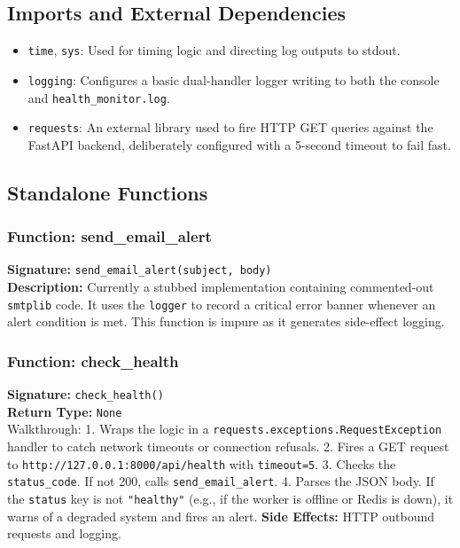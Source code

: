 \documentclass[12pt,a4paper]{report}
\begin{document}
\subsection{Imports and External Dependencies}
\begin{itemize}
\item \texttt{time}, \texttt{sys}: Used for timing logic and directing log outputs to stdout.
\item \texttt{logging}: Configures a basic dual-handler logger writing to both the console and \texttt{health\_monitor.log}.
\item \texttt{requests}: An external library used to fire HTTP GET queries against the FastAPI backend, deliberately configured with a 5-second timeout to fail fast.
\end{itemize}

\subsection{Standalone Functions}
\subsubsection{Function: send\_email\_alert}
\textbf{Signature:} \texttt{send\_email\_alert(subject, body)} \\
\textbf{Description:} Currently a stubbed implementation containing commented-out \texttt{smtplib} code. It uses the \texttt{logger} to record a critical error banner whenever an alert condition is met. This function is impure as it generates side-effect logging.

\subsubsection{Function: check\_health}
\textbf{Signature:} \texttt{check\_health()} \\
\textbf{Return Type:} \texttt{None} \\
Walkthrough:
1. Wraps the logic in a \texttt{requests.exceptions.RequestException} handler to catch network timeouts or connection refusals.
2. Fires a GET request to \texttt{http://127.0.0.1:8000/api/health} with \texttt{timeout=5}.
3. Checks the \texttt{status\_code}. If not 200, calls \texttt{send\_email\_alert}.
4. Parses the JSON body. If the \texttt{status} key is not \texttt{"healthy"} (e.g., if the worker is offline or Redis is down), it warns of a degraded system and fires an alert.
\textbf{Side Effects:} HTTP outbound requests and logging.
\end{document}
